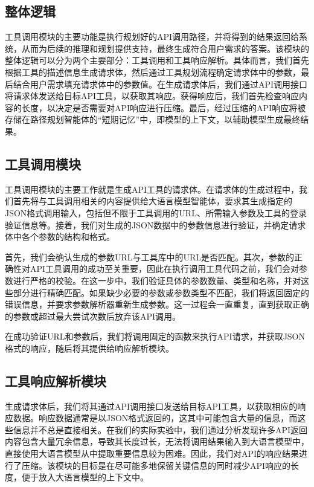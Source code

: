 \subsection{整体逻辑}

工具调用模块的主要功能是执行规划好的API调用路径，并将得到的结果返回给系统，从而为后续的推理和规划提供支持，最终生成符合用户需求的答案。该模块的整体逻辑可以分为两个主要部分：工具调用和工具响应解析。具体而言，我们首先根据工具的描述信息生成请求体，然后通过工具规划流程确定请求体中的参数，最后结合用户需求填充请求体中的参数值。在生成请求体后，我们通过API调用接口将请求体发送给目标API工具，以获取其响应。获得响应后，我们首先检查响应内容的长度，以决定是否需要对API响应进行压缩。最后，经过压缩的API响应将被存储在路径规划智能体的“短期记忆”中，即模型的上下文，以辅助模型生成最终结果。

\subsection{工具调用模块}

工具调用模块的主要工作就是生成API工具的请求体。在请求体的生成过程中，我们首先将与工具调用相关的内容提供给大语言模型智能体，要求其生成指定的JSON格式调用输入，包括但不限于工具调用的URL、所需输入参数及工具的登录验证信息等。接着，我们对生成的JSON数据中的参数信息进行验证，并确定请求体中各个参数的结构和格式。

首先，我们会确认生成的参数URL与工具库中的URL是否匹配。其次，参数的正确性对API工具调用的成功至关重要，因此在执行调用工具代码之前，我们会对参数进行严格的校验。在这一步中，我们验证具体的参数数量、类型和名称，并对这些部分进行精确匹配。如果缺少必要的参数或参数类型不匹配，我们将返回固定的错误信息，并要求参数解析器重新生成参数。这一过程会一直重复，直到获取正确的参数或超过最大尝试次数后放弃该API调用。

在成功验证URL和参数后，我们将调用固定的函数来执行API请求，并获取JSON格式的响应，随后将其提供给响应解析模块。

\subsection{工具响应解析模块}

生成请求体后，我们将其通过API调用接口发送给目标API工具，以获取相应的响应数据。响应数据通常是以JSON格式返回的，这其中可能包含大量的信息，而这些信息并不总是直接相关。在我们的实际实验中，我们通过分析发现许多API返回内容包含大量冗余信息，导致其长度过长，无法将调用结果输入到大语言模型中，直接使用大语言模型从中提取重要信息较为困难。因此，我们对API的响应结果进行了压缩。该模块的目标是在尽可能多地保留关键信息的同时减少API响应的长度，便于放入大语言模型的上下文中。


